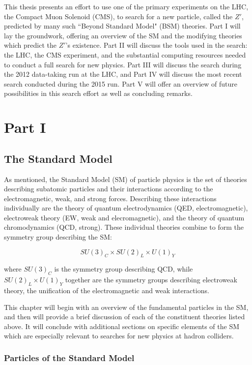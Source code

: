 This thesis presents an effort to use one of the primary experiments on the LHC, the Compact Muon Solenoid (CMS), to search for a new particle, called the \emph{$Z\prime$}, predicted by many such ``Beyond Standard Model" (BSM) theories. Part I will lay the groundwork, offering an overview of the SM and the modifying theories which predict the $Z\prime$'s existence. Part II will discuss the tools used in the search: the LHC, the CMS experiment, and the substantial computing resources needed to conduct a full search for new physics. Part III will discuss the search during the 2012 data-taking run at the LHC, and Part IV will discuss the most recent search conducted during the 2015 run. Part V will offer an overview of future possibilities in this search effort as well as concluding remarks.

\part{\huge Part I}

\chapter{The Standard Model}


As mentioned, the Standard Model (SM) of particle physics is the set of theories describing subatomic particles and their interactions according to the electromagnetic, weak, and strong forces. Describing these interactions individually are the theory of quantum electrodynamics (QED, electromagnetic), electroweak theory (EW, weak and elecromagnetic), and the theory of quantum chromodynamics (QCD, strong). These individual theories combine to form the symmetry group describing the SM:

$$SU(3)_{C} \times SU(2)_{L} \times U(1)_{Y}$$

where $SU(3)_{C}$ is the symmetry group describing QCD, while $SU(2)_{L} \times U(1)_{Y}$ together are the symmetry groups describing electroweak theory, the unification of the electromagnetic and weak interactions.

 This chapter will begin with an overview of the fundamental particles in the SM, and then will provide a brief discussion of each of the constituent theories listed above. It will conclude with additional sections on specific elements of the SM which are especially relevant to searches for new physics at hadron colliders.

\section{Particles of the Standard Model}


